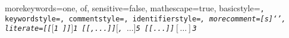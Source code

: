   {
    morekeywords={one, of},
    sensitive=false,
    mathescape=true,
    basicstyle=\footnotesize\tt,
    keywordstyle=\footnotesize\tt,
    commentstyle=\footnotesize\tt,
    identifierstyle=\footnotesize\it,
    morecomment=[s]{`}{'},
    literate={[[}{{$[$}}{1}
             {]]}{{$]$}}{1}
             {[[,...]]}{{$[$, $\ldots]$}}{5}
             {[[...]]}{{$[\ldots]$}}{3}
  }


\newcommand{\sntx}[1]{\lstinline[language=syntax,basicstyle=\normalsize\tt,identifierstyle=\normalsize\it]!#1!}
